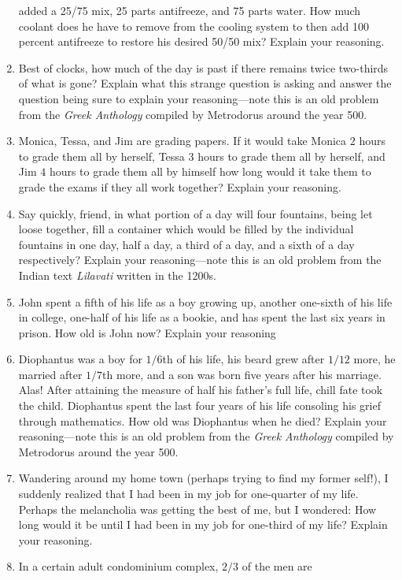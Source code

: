 \begin{problems}
\begin{enumerate}
  added a 25/75 mix, 25 parts antifreeze, and 75 parts water.  How
  much coolant does he have to remove from the cooling system to then
  add 100 percent antifreeze to restore his desired 50/50 mix? Explain
  your reasoning.
\item Best of clocks, how much of the day is past if there remains
  twice two-thirds of what is gone? Explain what this strange question
  is asking and answer the question being sure to explain your
  reasoning---note this is an old problem from the \textit{Greek
    Anthology} compiled by Metrodorus around the year 500.
\item Monica, Tessa, and Jim are grading papers. If it would take
  Monica $2$ hours to grade them all by herself, Tessa $3$ hours to
  grade them all by herself, and Jim $4$ hours to grade them all by
  himself how long would it take them to grade the exams if they all
  work together? Explain your reasoning.
\item Say quickly, friend, in what portion of a day will four
  fountains, being let loose together, fill a container which would
  be filled by the individual fountains in one day, half a day, a
  third of a day, and a sixth of a day respectively? Explain your
  reasoning---note this is an old problem from the Indian text
  \textit{Lilavati} written in the 1200s.
\item John spent a fifth of his life as a boy growing up, another
  one-sixth of his life in college, one-half of his life as a bookie,
  and has spent the last six years in prison. How old is John now?
  Explain your reasoning
\item Diophantus was a boy for $1/6$th of his life, his beard grew
  after $1/12$ more, he married after $1/7$th more, and a son was born
  five years after his marriage. Alas! After attaining the measure of
  half his father's full life, chill fate took the child. Diophantus
  spent the last four years of his life consoling his grief through
  mathematics. How old was Diophantus when he died?  Explain your
  reasoning---note this is an old problem from the \textit{Greek
    Anthology} compiled by Metrodorus around the year 500.
\item Wandering around my home town (perhaps trying to find my former
  self!), I suddenly realized that I had been in my job for
  one-quarter of my life. Perhaps the melancholia was getting the best
  of me, but I wondered: How long would it be until I had been in my
  job for one-third of my life? Explain your reasoning.
\item In a certain adult condominium complex, $2/3$ of the men are

\end{enumerate}
\end{problems}

